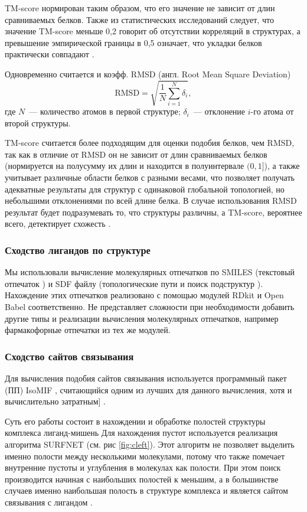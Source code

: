 \documentclass[a4paper,14pt]{article}         %
\begin{document}
TM-score нормирован таким образом, что его значение не зависит от длин сравниваемых белков. Также из статистических исследований следует, что значение TM-score меньше 0,2 говорит об отсутствии корреляций в структурах, а превышение эмпирической границы в 0,5 означает, что укладки белков практически совпадают \cite{TMalign, Xu2010}. 

Одновременно считается и коэфф. RMSD (англ. Root Mean Square Deviation) %
\begin{equation}
\label{rmsd}
\text{RMSD} = \sqrt{\frac{1}{N}\sum_{i=1}^N \delta_i},
\end{equation}
где $N$~--- количество атомов в первой структуре; $\delta_i$~--- отклонение $i$-го атома от второй структуры.

TM-score считается более подходящим для оценки подобия белков, чем RMSD, так как в отличие от RMSD он не зависит от длин сравниваемых белков (нормируется на полусумму их длин и находится в полуинтервале $(0, 1]$), а также учитывает различные области белков с разными весами, что позволяет получать адекватные результаты для структур с одинаковой глобальной топологией, но небольшими отклонениями по всей длине белка. В случае использования RMSD результат будет подразумевать то, что структуры различны, а TM-score, вероятнее всего, детектирует схожесть \cite{TMalign}.
\subsubsection{Сходство лигандов по структуре}
Мы использовали вычисление молекулярных отпечатков по SMILES (текстовый отпечаток \cite{Weininger1989}) и SDF файлу (топологические пути и поиск подструктур \cite{Cereto-Massague2015}). Нахождение этих отпечатков реализовано с помощью модулей RDkit \cite{rdkit} и Open Babel \cite{openbabel} соответственно. Не представляет сложности при необходимости добавить другие типы и реализации вычисления молекулярных отпечатков, например фармакофорные отпечатки из тех же модулей.

\subsubsection{Сходство сайтов связывания}

Для вычисления подобия сайтов связывания используется программный пакет (ПП) IsoMIF \cite{isomif, Chartier2015}, считающийся одним из лучших для данного вычисления, хотя и вычислительно затратным] \cite{Ehrt2016}.

Суть его работы состоит в нахождении и обработке полостей структуры комплекса лиганд-мишень\cite{Gaudreault2015} Для нахождения пустот используется реализация алгоритма SURFNET \cite{Laskowski1995} (см. рис \ref{fig:cleft}). Этот алгоритм не позволяет выделить именно полости между несколькими молекулами, потому что также помечает внутренние пустоты и углубления в молекулах как полости. При этом поиск производится начиная с наибольших полостей к меньшим, а в большинстве случаев именно наибольшая полость в структуре комплекса и является сайтом связывания с лигандом \cite{Laskowski1995}. 
\end{document}
